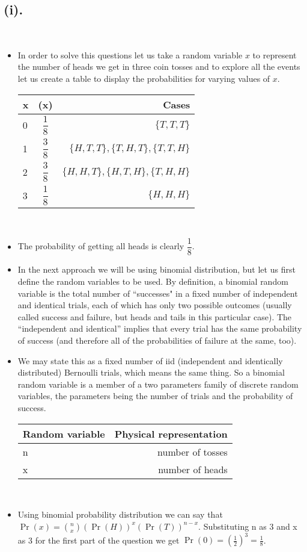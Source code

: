 \documentclass{article}
\begin{document}
	\subsection*{(i).}\\
	\begin{itemize}
		\item In order to solve this questions let us take a random variable $x$ to represent the number of heads we get in three coin tosses and to explore all the events let us create a table to display the probabilities for varying values of $x$.\\[6pt]
		\begin{tabular}{|l|c|r|}
			\hline
			x & \Pr(x) & Cases\\
			\hline
			0 & $\dfrac{1}{8}$ & $\{T,T,T\}$\\[8pt]
			\hline
			1 & $\dfrac{3}{8}$ & $\{H,T,T\}, \{T,H,T\}, \{T,T,H\}$\\[8pt]
			\hline
			2 & $\dfrac{3}{8}$ & $\{H,H,T\}, \{H,T,H\}, \{T,H,H\}$\\[8pt]
			\hline
			3 & $\dfrac{1}{8}$ & $\{H,H,H\}$ \\[8pt]
			\hline
		\end{tabular}\\[6pt]
		\item The probability of getting all heads is clearly $\dfrac{1}{8}$.\\[4pt]
		\item In the next approach we will be using binomial distribution, but let us first define the random variables to be used. By definition, a binomial random variable is the total number of “successes" in a fixed number of independent and identical trials, each of which has only two possible outcomes (usually called success and failure, but heads and tails in this particular case). The “independent and identical” implies that every trial has the same probability of success (and therefore all of the probabilities of failure at the same, too).\\[6pt]
		\item We may state this as a fixed number of iid (independent and identically distributed) Bernoulli trials, which means the same thing. So a binomial random variable is a member of a two parameters family of discrete random variables, the parameters being the number of trials and the probability of success.\\[8pt]
		\begin{tabular}{|l|r|}
			\hline
			Random variable & Physical representation\\
			\hline
			n & number of tosses\\
			\hline
			x & number of heads\\
			\hline
		\end{tabular}\\[4pt]
		\item Using binomial probability distribution we can say that $\Pr(x)={n\choose x}(\Pr(H))^x(\Pr(T))^{n-x}$. Substituting n as 3 and x as 3 for the first part of the question we get $\Pr(0)=(\frac{1}{2})^3=\frac{1}{8}$.
	\end{itemize}
	
\end{document}
